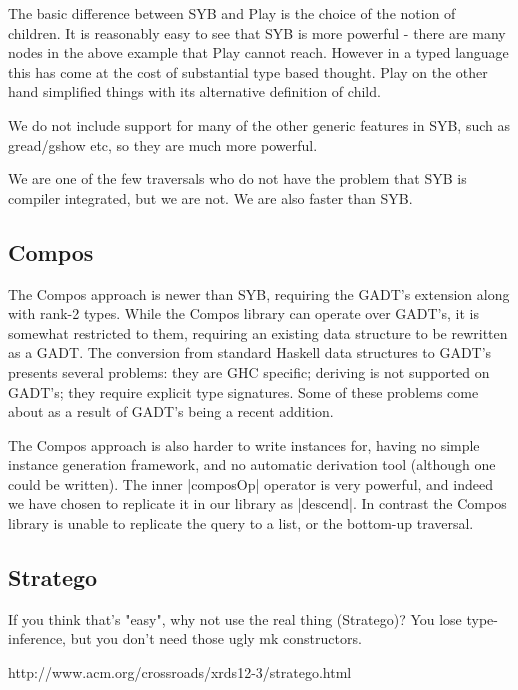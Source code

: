 \documentclass[preprint]{sigplanconf}
\newenvironment{code}{\begin{alltt}\small}{\end{alltt}}
\begin{document}
\begin{code}
\end{code}

The basic difference between SYB and Play is the choice of the notion of children. It is reasonably easy to see that SYB is more powerful - there are many nodes in the above example that Play cannot reach. However in a typed language this has come at the cost of substantial type based thought. Play on the other hand simplified things with its alternative definition of child.

We do not include support for many of the other generic features in SYB, such as gread/gshow etc, so they are much more powerful.

We are one of the few traversals who do not have the problem that SYB is compiler integrated, but we are not. We are also faster than SYB.

\subsection{Compos}

The Compos approach is newer than SYB, requiring the GADT's extension along with rank-2 types. While the Compos library can operate over GADT's, it is somewhat restricted to them, requiring an existing data structure to be rewritten as a GADT. The conversion from standard Haskell data structures to GADT's presents several problems: they are GHC specific; deriving is not supported on GADT's; they require explicit type signatures. Some of these problems come about as a result of GADT's being a recent addition.

The Compos approach is also harder to write instances for, having no simple instance generation framework, and no automatic derivation tool (although one could be written). The inner |composOp| operator is very powerful, and indeed we have chosen to replicate it in our library as |descend|. In contrast the Compos library is unable to replicate the query to a list, or the bottom-up traversal.

\subsection{Stratego}

If you think that's "easy", why not use the real thing (Stratego)? You lose type-inference, but you don't need those ugly mk constructors.

http://www.acm.org/crossroads/xrds12-3/stratego.html
\end{document}
